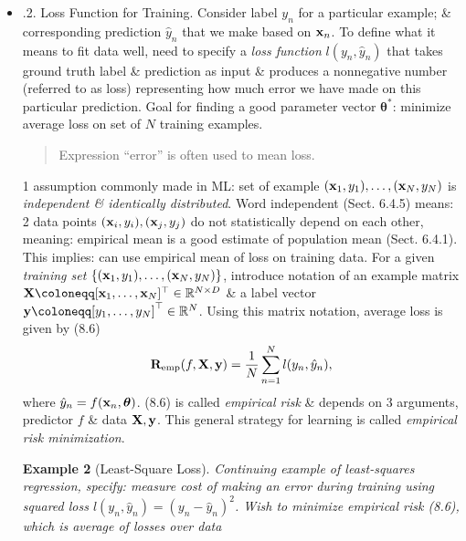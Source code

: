 \documentclass{article}
\newtheorem{example}{Example}
\begin{document}
\begin{itemize}
\begin{itemize}
\begin{itemize}
\begin{example}
				Instead of a linear function, may wish to consider nonlinear functions as predictors. Recent advances in neural networks allow for efficient computation of more complex nonlinear function classes.
			\end{example}
			Given class of functions, want to search for a good predictor. Now move on to 2nd ingredient of empirical risk minimization: how to measure how well predictor fits training data.
			\item {.2. Loss Function for Training.} Consider label $y_n$ for a particular example; \& corresponding prediction $\hat{y}_n$ that we make based on ${\bf x}_n$. To define what it means to fit data well, need to specify a {\it loss function} $l(y_n,\hat{y}_n)$ that takes ground truth label \& prediction as input \& produces a nonnegative number (referred to as loss) representing how much error we have made on this particular prediction. Goal for finding a good parameter vector $\boldsymbol{\theta}^*$: minimize average loss on set of $N$ training examples.
			\begin{quote}
				Expression ``error'' is often used to mean loss.
			\end{quote}
			1 assumption commonly made in ML: set of example $({\bf x}_1,y_1),\ldots,({\bf x}_N,y_N)$ is {\it independent \& identically distributed}. Word independent (Sect. 6.4.5) means: 2 data points $({\bf x}_i,y_i),({\bf x}_j,y_j)$ do not statistically depend on each other, meaning: empirical mean is a good estimate of population mean (Sect. 6.4.1). This implies: can use empirical mean of loss on training data. For a given {\it training set} $\{({\bf x}_1,y_1),\ldots,({\bf x}_N,y_N)\}$, introduce notation of an example matrix ${\bf X}\coloneqq[{\bf x}_1,\ldots,{\bf x}_N]^\top\in\mathbb{R}^{N\times D}$ \& a label vector ${\bf y}\coloneqq[y_1,\ldots,y_N]^\top\in\mathbb{R}^N$. Using this matrix notation, average loss is given by (8.6)
			\begin{equation}
				{\bf R}_{\rm emp}(f,{\bf X},{\bf y}) = \frac{1}{N}\sum_{n=1}^N l(y_n,\hat{y}_n),
			\end{equation}
			where $\hat{y}_n = f({\bf x}_n,\boldsymbol{\theta})$. (8.6) is called {\it empirical risk} \& depends on 3 arguments, predictor $f$ \& data ${\bf X},{\bf y}$. This general strategy for learning is called {\it empirical risk minimization}.
			\begin{example}[Least-Square Loss]
				Continuing example of least-squares regression, specify: measure cost of making an error during training using squared loss $l(y_n,\hat{y}_n) = (y_n - \hat{y}_n)^2$. Wish to minimize empirical risk (8.6), which is average of losses over data

\end{example}
\end{itemize}
\end{itemize}
\end{itemize}
\end{document}
